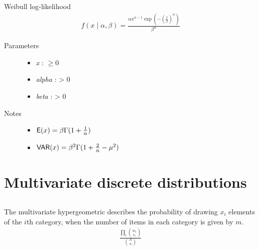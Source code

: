 \documentclass[]{jss}
\begin{document}
\subsection[Weibull]{ }


Weibull log-likelihood
\begin{eqnarray*}
    f(x \mid \alpha, \beta) = \frac{\alpha x^{\alpha - 1}
    \exp(-(\frac{x}{\beta})^{\alpha})}{\beta^\alpha}    
\end{eqnarray*}
\begin{description}
\item[Parameters] \leavevmode\begin{itemize}
\item {} 
\emph{x} : $\ge 0$

\item {} 
\emph{alpha} : \textgreater{} 0

\item {} 
\emph{beta} : \textgreater{} 0

\end{itemize}

\item[Notes]\leavevmode\begin{itemize}
\item {} 
$\mathsf{E}(x)=\beta \Gamma(1+\frac{1}{\alpha})$

\item {} 
$\mathsf{VAR}(x)=\beta^2 \Gamma(1+\frac{2}{\alpha} - \mu^2)$

\end{itemize}

\end{description}


\section{Multivariate discrete distributions}
\subsection[multivariate hypergeometric]{ }


The multivariate hypergeometric describes the probability of drawing $x_i$
elements of the $i$th category, when the number of items in each category is
given by $m$.
\begin{eqnarray*}
\frac{\prod_i \binom{m_i}{x_i}}{\binom{N}{n}}    
\end{eqnarray*}
\end{document}
